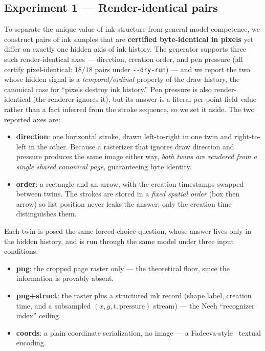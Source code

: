 \documentclass[11pt]{article}
\newcommand{\code}[1]{\texttt{#1}}
\begin{document}
\subsection{Experiment 1 --- Render-identical pairs}
\label{sec:m1method}
To separate the unique value of ink structure from general model competence, we
construct pairs of ink samples that are \textbf{certified byte-identical in
pixels} yet differ on exactly one hidden axis of ink history. The generator
supports three such render-identical axes --- direction, creation order, and pen
pressure (all certify pixel-identical: $18/18$ pairs under \code{-{}-dry-run}) ---
and we report the two whose hidden signal is a \emph{temporal/ordinal} property of
the draw history, the canonical case for ``pixels destroy ink history.'' Pen
pressure is also render-identical (the renderer ignores it), but its answer is a
literal per-point field value rather than a fact inferred from the stroke
sequence, so we set it aside. The two reported axes are:

\begin{itemize}[leftmargin=1.4em, itemsep=1pt]
\item \textbf{direction}: one horizontal stroke, drawn left-to-right in one twin
  and right-to-left in the other. Because a rasterizer that ignores draw
  direction and pressure produces the same image either way, \emph{both twins are
  rendered from a single shared canonical page}, guaranteeing byte identity.
\item \textbf{order}: a rectangle and an arrow, with the creation timestamps
  swapped between twins. The strokes are stored in a \emph{fixed spatial order}
  (box then arrow) so list position never leaks the answer; only the creation
  time distinguishes them.
\end{itemize}

Each twin is posed the same forced-choice question, whose answer lives only in
the hidden history, and is run through the same model under three input
conditions:
\begin{itemize}[leftmargin=1.4em, itemsep=1pt]
\item \textbf{png}: the cropped page raster only --- the theoretical floor, since
  the information is provably absent.
\item \textbf{png+struct}: the raster plus a structured ink record (shape label,
  creation time, and a subsampled $(x,y,t,\text{pressure})$ stream) --- the
  Neeh ``recognizer index'' ceiling.
\item \textbf{coords}: a plain coordinate serialization, no image --- a
  Fadeeva-style~\cite{fadeeva2024} textual encoding.
\end{itemize}
\end{document}
